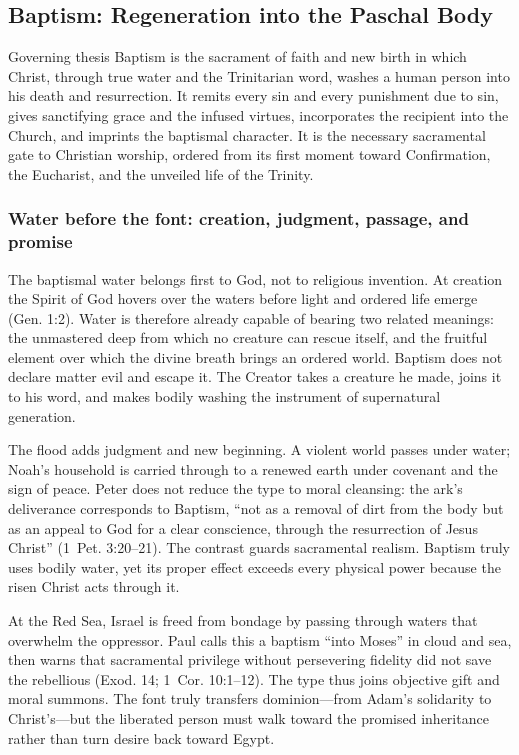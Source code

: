 \subsection{Baptism: Regeneration into the Paschal Body}

\begin{studybox}{Governing thesis}
Baptism is the sacrament of faith and new birth in which Christ, through true water and the Trinitarian word, washes a human person into his death and resurrection. It remits every sin and every punishment due to sin, gives sanctifying grace and the infused virtues, incorporates the recipient into the Church, and imprints the baptismal character. It is the necessary sacramental gate to Christian worship, ordered from its first moment toward Confirmation, the Eucharist, and the unveiled life of the Trinity.
\end{studybox}

\subsubsection{Water before the font: creation, judgment, passage, and promise}

The baptismal water belongs first to God, not to religious invention. At creation the Spirit of God hovers over the waters before light and ordered life emerge (Gen. 1:2). Water is therefore already capable of bearing two related meanings: the unmastered deep from which no creature can rescue itself, and the fruitful element over which the divine breath brings an ordered world. Baptism does not declare matter evil and escape it. The Creator takes a creature he made, joins it to his word, and makes bodily washing the instrument of supernatural generation.

The flood adds judgment and new beginning. A violent world passes under water; Noah's household is carried through to a renewed earth under covenant and the sign of peace. Peter does not reduce the type to moral cleansing: the ark's deliverance corresponds to Baptism, ``not as a removal of dirt from the body but as an appeal to God for a clear conscience, through the resurrection of Jesus Christ'' (1~Pet. 3:20--21). The contrast guards sacramental realism. Baptism truly uses bodily water, yet its proper effect exceeds every physical power because the risen Christ acts through it.

At the Red Sea, Israel is freed from bondage by passing through waters that overwhelm the oppressor. Paul calls this a baptism ``into Moses'' in cloud and sea, then warns that sacramental privilege without persevering fidelity did not save the rebellious (Exod. 14; 1~Cor. 10:1--12). The type thus joins objective gift and moral summons. The font truly transfers dominion---from Adam's solidarity to Christ's---but the liberated person must walk toward the promised inheritance rather than turn desire back toward Egypt.

